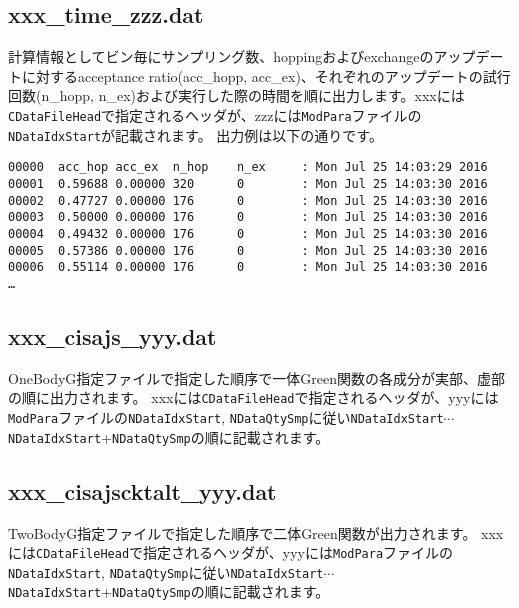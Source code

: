 \subsection{xxx\_time\_zzz.dat }
\label{subsec:time}
計算情報としてビン毎にサンプリング数、hoppingおよびexchangeのアップデートに対するacceptance ratio(acc\_hopp, acc\_ex)、それぞれのアップデートの試行回数(n\_hopp, n\_ex)および実行した際の時間を順に出力します。xxxには\verb|CDataFileHead|で指定されるヘッダが、zzzには\verb|ModPara|ファイルの\verb|NDataIdxStart|が記載されます。
出力例は以下の通りです。\\
\begin{minipage}{15.5cm}
\begin{screen}
\begin{verbatim}
00000  acc_hop acc_ex  n_hop    n_ex     : Mon Jul 25 14:03:29 2016
00001  0.59688 0.00000 320      0        : Mon Jul 25 14:03:30 2016
00002  0.47727 0.00000 176      0        : Mon Jul 25 14:03:30 2016
00003  0.50000 0.00000 176      0        : Mon Jul 25 14:03:30 2016
00004  0.49432 0.00000 176      0        : Mon Jul 25 14:03:30 2016
00005  0.57386 0.00000 176      0        : Mon Jul 25 14:03:30 2016
00006  0.55114 0.00000 176      0        : Mon Jul 25 14:03:30 2016    
…
\end{verbatim}
\end{screen}
\end{minipage}

\subsection{xxx\_cisajs\_yyy.dat }
OneBodyG指定ファイルで指定した順序で一体Green関数の各成分が実部、虚部の順に出力されます。
xxxには\verb|CDataFileHead|で指定されるヘッダが、yyyには\verb|ModPara|ファイルの\verb|NDataIdxStart|, \verb|NDataQtySmp|に従い\verb|NDataIdxStart|$\cdots$\verb|NDataIdxStart|+\verb|NDataQtySmp|の順に記載されます。

\subsection{xxx\_cisajscktalt\_yyy.dat }
TwoBodyG指定ファイルで指定した順序で二体Green関数が出力されます。
xxxには\verb|CDataFileHead|で指定されるヘッダが、yyyには\verb|ModPara|ファイルの\verb|NDataIdxStart|, \verb|NDataQtySmp|に従い\verb|NDataIdxStart|$\cdots$\verb|NDataIdxStart|+\verb|NDataQtySmp|の順に記載されます。

